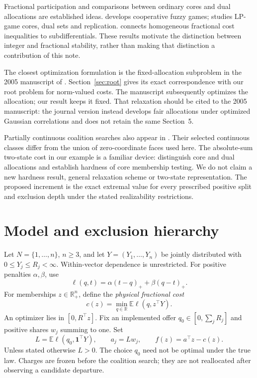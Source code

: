 \documentclass[11pt,a4paper]{article}
\theoremstyle{remark}
\newcommand{\E}{\mathbb E}
\newcommand{\R}{\mathbb R}
\newcommand{\one}{\mathbf 1}
\begin{document}
Fractional participation and comparisons between ordinary cores and dual
allocations are established ideas. \citet{aubin1981fuzzy} develops cooperative
fuzzy games; \citet{samet1984dualcore} studies LP-game cores, dual sets and
replication. \citet{denault2001coherent} connects homogeneous fractional cost
inequalities to subdifferentials. These results motivate the distinction
between integer and fractional stability, rather than making that
distinction a contribution of this note.

The closest optimization formulation is the fixed-allocation subproblem in
the 2005 manuscript of \citet[Sections 5.2--5.3, Eq.~19]{burer2005centralized}.
Section~\ref{sec:root} gives its exact correspondence with our root problem
for norm-valued costs. The manuscript subsequently optimizes the allocation;
our result keeps it fixed. That relaxation should be cited to the 2005
manuscript: the journal version \citep{burer2012newsvendor} instead develops
fair allocations under optimized Gaussian correlations and does not retain
the same Section~5.

Partially continuous coalition searches also appear in
\citet[Sections 4--6]{bonnans2008leastcore}. Their selected continuous
classes differ from the union of zero-coordinate faces used here. The
absolute-sum two-state cost in our example is a familiar device:
\citet[Example 1 and Theorem 7]{chenzhang2009inventorygames} distinguish core
and dual allocations and establish hardness of core membership testing.
We do not claim a new hardness result, general relaxation scheme or
two-state representation. The proposed increment is the exact extremal
value for every prescribed positive split and exclusion depth under the
stated realizability restrictions.

\section{Model and exclusion hierarchy}\label{sec:model}

Let $N=\{1,\ldots,n\}$, $n\ge3$, and let $Y=(Y_1,\ldots,Y_n)$ be jointly
distributed with $0\le Y_j\le R_j<\infty$. Within-vector dependence is
unrestricted. For positive penalties $\alpha,\beta$, use
\begin{equation}\label{eq:loss}
 \ell(q,t)=\alpha(t-q)_++\beta(q-t)_+.
\end{equation}
For memberships $z\in\R_+^n$, define the \emph{physical fractional cost}
\begin{equation}\label{eq:cost}
 c(z)=\min_{q\in\R}\E\ell(q,z^\top Y).
\end{equation}
An optimizer lies in $[0,R^\top z]$. Fix an implemented offer
$q_0\in[0,\sum_jR_j]$ and positive shares $w_j$ summing to one. Set
\[
 L=\E\ell(q_0,\one^\top Y),\qquad a_j=Lw_j,\qquad
 f(z)=a^\top z-c(z).
\]
Unless stated otherwise $L>0$. The choice $q_0$ need not be optimal under
the true law. Charges are frozen before the coalition search; they are
not reallocated after observing a candidate departure.
\end{document}
